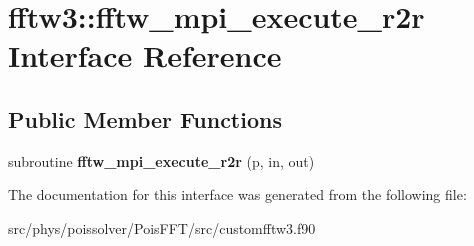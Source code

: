 \hypertarget{interfacefftw3_1_1fftw__mpi__execute__r2r}{}\section{fftw3\+:\+:fftw\+\_\+mpi\+\_\+execute\+\_\+r2r Interface Reference}
\label{interfacefftw3_1_1fftw__mpi__execute__r2r}
\subsection*{Public Member Functions}
\begin{DoxyCompactItemize}
\item 
subroutine {\bfseries fftw\+\_\+mpi\+\_\+execute\+\_\+r2r} (p, in, out)\hypertarget{interfacefftw3_1_1fftw__mpi__execute__r2r_ac872312383189989233cefc8bb902bb1}{}\label{interfacefftw3_1_1fftw__mpi__execute__r2r_ac872312383189989233cefc8bb902bb1}

\end{DoxyCompactItemize}


The documentation for this interface was generated from the following file\+:\begin{DoxyCompactItemize}
\item 
src/phys/poissolver/\+Pois\+F\+F\+T/src/customfftw3.\+f90\end{DoxyCompactItemize}
